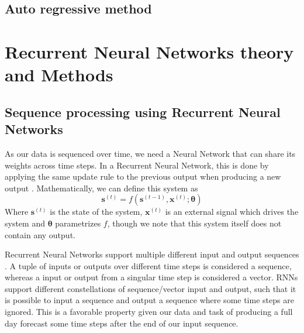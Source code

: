 \documentclass
[twocolumn,
secnumarabic,
nobibnotes,
aps,
prl,
reprint,
groupedaddress,
amsmath,
amssymb,
]{revtex4-2}
\begin{document}
\subsection{Auto regressive method}


\section{Recurrent Neural Networks theory and Methods}

\subsection{Sequence processing using Recurrent Neural Networks}
As our data is sequenced over time, we need a Neural Network that can share its weights across time steps. In a Recurrent Neural Network, this is done by applying the same update rule to the previous output when producing a new output \cite{Goodfellow2016}. Mathematically, we can define this system as
\begin{equation}
  \nonumber
  \bm{s}^{(t)} = f(\bm{s}^{(t-1)},\bm{x}^{(t)};\bm{\theta})
\end{equation}
Where $\bm{s}^{(t)}$ is the state of the system, $\bm{x}^{(t)}$ is an external signal which drives the system and $\bm{\theta}$ parametrizes $f$, though we note that this system itself does not contain any output. 

Recurrent Neural Networks support multiple different input and output sequences \cite{Geron2019}. A tuple of inputs or outputs over different time steps is considered a sequence, whereas a input or output from a singular time step is considered a vector. RNNs support different constellations of sequence/vector input and output, such that it is possible to input a sequence and output a sequence where some time steps are ignored. This is a favorable property given our data and task of producing a full day forecast some time steps after the end of our input sequence.
\end{document}
